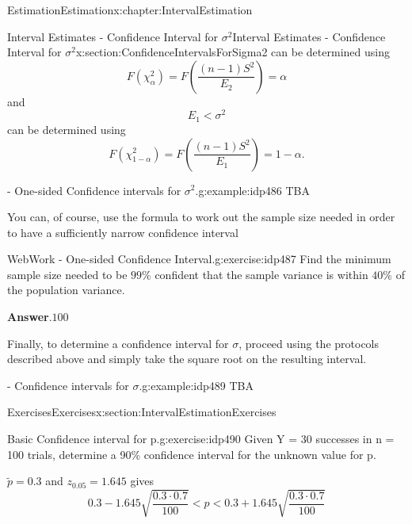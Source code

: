 \documentclass[oneside,10pt,]{book}
\newcommand{\blocktitlefont}{\relax}
\numberwithin{equation}{section}
\newcommand{\lt}{<}
\begin{document}
\begin{chapterptx}{Estimation}{}{Estimation}{}{}{x:chapter:IntervalEstimation}
\begin{sectionptx}{Interval Estimates - Confidence Interval for \(\sigma^2\)}{}{Interval Estimates - Confidence Interval for \(\sigma^2\)}{}{}{x:section:ConfidenceIntervalsForSigma2}
can be determined using%
\begin{equation*}
F(\chi^2_{\alpha} ) = F \left ( \frac{(n-1)S^2}{E_2} \right ) = \alpha
\end{equation*}
and%
\begin{equation*}
E_1 \lt \sigma^2 
\end{equation*}
can be determined using%
\begin{equation*}
F(\chi^2_{1-\alpha} ) = F \left ( \frac{(n-1)S^2}{E_1} \right ) = 1 - \alpha.
\end{equation*}
%
\begin{example}{- One-sided Confidence intervals for \(\sigma^2\).}{g:example:idp486}%
TBA%
\end{example}
You can, of course, use the formula to work out the sample size needed in order to have a sufficiently narrow confidence interval%
\begin{inlineexercise}{WebWork - One-sided Confidence Interval.}{g:exercise:idp487}%
Find the minimum sample size needed to be \(99\)\%  confident that the sample variance is within \(40\)\% of the population variance.%
\par\smallskip%
\noindent\textbf{\blocktitlefont Answer}.\hypertarget{g:answer:idp488}{}\quad{}\(100\)%
\end{inlineexercise}%
Finally, to determine a confidence interval for \(\sigma\), proceed using the protocols described above and simply take the square root on the resulting interval.%
\begin{example}{- Confidence intervals for \(\sigma\).}{g:example:idp489}%
TBA%
\end{example}
\end{sectionptx}
%
%
\typeout{************************************************}
\typeout{************************************************}
%
\begin{sectionptx}{Exercises}{}{Exercises}{}{}{x:section:IntervalEstimationExercises}
\begin{inlineexercise}{Basic Confidence interval for p.}{g:exercise:idp490}%
Given Y = 30 successes in n = 100 trials, determine a 90\% confidence interval for the unknown value for p.%
\par\smallskip%
\noindent\hypertarget{g:solution:idp491}{}\(\tilde{p} = 0.3\) and \(z_{0.05} = 1.645\) gives%
\begin{equation*}
0.3 - 1.645 \sqrt{\frac{0.3 \cdot 0.7}{100}} \lt p \lt 0.3 + 1.645 \sqrt{\frac{0.3 \cdot 0.7}{100}}
\end{equation*}

\end{inlineexercise}
\end{sectionptx}
\end{chapterptx}
\end{document}
